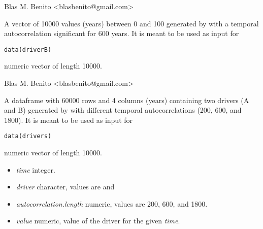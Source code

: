 \documentclass[letterpaper]{book}
\begin{document}
%
\begin{Author}\relax
Blas M. Benito  <blasbenito@gmail.com>
\end{Author}
%
\begin{SeeAlso}\relax
{}
\end{SeeAlso}
%
\begin{Description}\relax
A vector of 10000 values (years) between 0 and 100 generated by  with a temporal autocorrelation significant for 600 years. It is meant to be used as input for 
\end{Description}
%
\begin{Usage}
\begin{verbatim}
data(driverB)
\end{verbatim}
\end{Usage}
%
\begin{Format}
numeric vector of length 10000.
\end{Format}
%
\begin{Author}\relax
Blas M. Benito  <blasbenito@gmail.com>
\end{Author}
%
\begin{SeeAlso}\relax
{}
\end{SeeAlso}
%
\begin{Description}\relax
A dataframe with 60000 rows and 4 columns (years) containing two drivers (A and B) generated by  with different temporal autocorrelations (200, 600, and 1800). It is meant to be used as input for 
\end{Description}
%
\begin{Usage}
\begin{verbatim}
data(drivers)
\end{verbatim}
\end{Usage}
%
\begin{Format}
numeric vector of length 10000.
\end{Format}
%
\begin{Details}\relax
\begin{itemize}

\item \emph{time} integer.
\item \emph{driver} character, values are  and 
\item \emph{autocorrelation.length} numeric, values are 200, 600, and 1800.
\item \emph{value} numeric, value of the driver for the given \emph{time}.

\end{itemize}

\end{Details}
\end{document}
